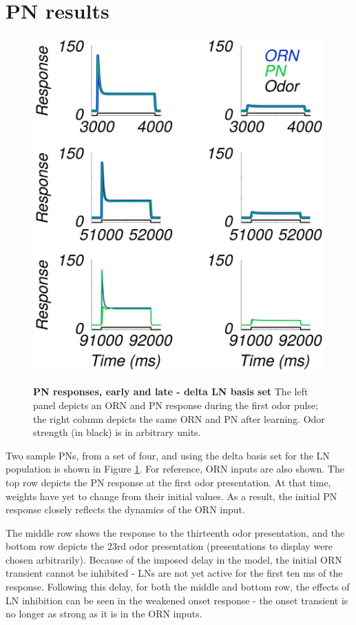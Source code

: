 \documentclass[a4paper,12pt,twoside]{article}
\begin{document}
\section{PN results}

\begin{figure}
\centering
\caption{\textbf{PN responses, early and late - delta LN basis set}  The left panel depicts an ORN and PN response during the first odor pulse; the right column depicts the same ORN and PN after learning.  Odor strength (in black) is in arbitrary units.}
\hspace*{-1.5 cm}
\includegraphics[scale=0.72]{2016-09-02_PN_3timepoints_deltabasis.png}
\label{fig:pn1}
\end{figure}

Two sample PNs, from a set of four, and using the delta basis set for the LN population is shown in Figure \ref{fig:pn1}.  For reference, ORN inputs are also shown.  The top row depicts the PN response at the first odor presentation.  At that time, weights have yet to change from their initial values.  As a result, the initial PN response closely reflects the dynamics of the ORN input.

The middle row shows the response to the thirteenth odor presentation, and the bottom row depicts the 23rd odor presentation (presentations to display were chosen arbitrarily).  Because of the imposed delay in the model, the initial ORN transient cannot be inhibited - LNs are not yet active for the first ten ms of the response.  Following this delay, for both the middle and bottom row, the effects of LN inhibition can be seen in the weakened onset response - the onset transient is no longer as strong as it is in the ORN inputs.  
\end{document}
